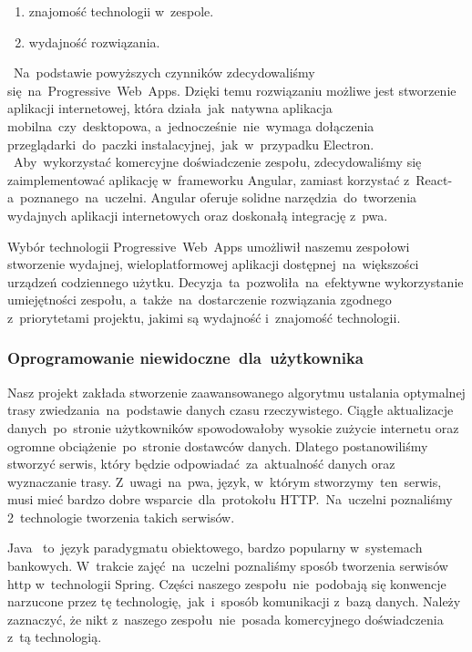 \begin{enumerate}
    \item znajomość technologii w~zespole.
    \item wydajność rozwiązania.
\end{enumerate}
\indent ~Na~podstawie powyższych czynników zdecydowaliśmy się~na~Progressive~Web~Apps.
Dzięki temu rozwiązaniu możliwe jest stworzenie aplikacji internetowej, która działa~jak~natywna aplikacja mobilna~czy~desktopowa, a~jednocześnie~nie~wymaga dołączenia przeglądarki~do~paczki instalacyjnej,~jak~w~przypadku Electron.
~Aby~wykorzystać komercyjne doświadczenie zespołu, zdecydowaliśmy się zaimplementować aplikację w~frameworku Angular, zamiast korzystać z~React-a~poznanego~na~uczelni.
Angular oferuje solidne narzędzia~do~tworzenia wydajnych aplikacji internetowych oraz doskonałą integrację z~\acrshort{pwa}.

\indent Wybór technologii Progressive~Web~Apps umożliwił naszemu zespołowi stworzenie wydajnej, wieloplatformowej aplikacji dostępnej~na~większości urządzeń codziennego użytku.
Decyzja~ta~pozwoliła~na~efektywne wykorzystanie umiejętności zespołu, a~także~na~dostarczenie rozwiązania zgodnego z~priorytetami projektu, jakimi są wydajność i~znajomość technologii.

\subsubsection{Oprogramowanie niewidoczne~dla~użytkownika}
\indent Nasz projekt zakłada stworzenie zaawansowanego algorytmu ustalania optymalnej trasy zwiedzania~na~podstawie danych czasu rzeczywistego.
Ciągłe aktualizacje danych~po~stronie użytkowników spowodowałoby wysokie zużycie internetu oraz ogromne obciążenie~po~stronie dostawców danych.
Dlatego postanowiliśmy stworzyć serwis, który będzie odpowiadać~za~aktualność danych oraz wyznaczanie trasy.
Z~uwagi~na~\acrshort{pwa}, język, w~którym stworzymy~ten~serwis, musi mieć bardzo dobre wsparcie~dla~protokołu HTTP\@.~Na~uczelni poznaliśmy 2~technologie tworzenia takich serwisów.

\indent Java ~to~język paradygmatu obiektowego, bardzo popularny w~systemach bankowych.
W~trakcie zajęć~na~uczelni poznaliśmy sposób tworzenia serwisów \acrshort{http} w~technologii Spring.
Części naszego zespołu~nie~podobają się konwencje narzucone przez tę technologię,~jak~i~sposób komunikacji z~bazą danych.
Należy zaznaczyć, że nikt z~naszego zespołu~nie~posada komercyjnego doświadczenia z~tą technologią.

